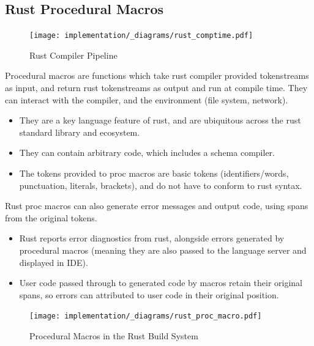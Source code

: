 \subsection{Rust Procedural Macros}
\begin{figure}[h!]
    \centering
    \texttt{[image: implementation/\_diagrams/rust\_comptime.pdf]}
    \caption{Rust Compiler Pipeline}
\end{figure}
\noindent
Procedural macros are functions which take rust compiler provided tokenstreams as input, and return rust tokenstreams as output and run at compile time. They can interact with the compiler, and the environment (file system, network).
\begin{itemize}
    \setlength\itemsep{0em}
    \item They are a key language feature of rust, and are ubiquitous across the rust standard library and ecosystem.
    \item They can contain arbitrary code, which includes a schema compiler.
    \item The tokens provided to proc macros are basic tokens (identifiers/words, punctuation, literals, brackets), and do not have to conform to rust syntax.
\end{itemize}
Rust proc macros can also generate error messages and output code, using spans from the original tokens.
\begin{itemize}
    \setlength\itemsep{0em}
    \item Rust reports error diagnostics from rust, alongside errors generated by procedural macros (meaning they are also passed to the language server and displayed in IDE).
    \item User code passed through to generated code by macros retain their original spans, so errors can attributed to user code in their original position.
\end{itemize}
\begin{figure}[h!]
    \centering
    \texttt{[image: implementation/\_diagrams/rust\_proc\_macro.pdf]}
    \caption{Procedural Macros in the Rust Build System}
\end{figure}

